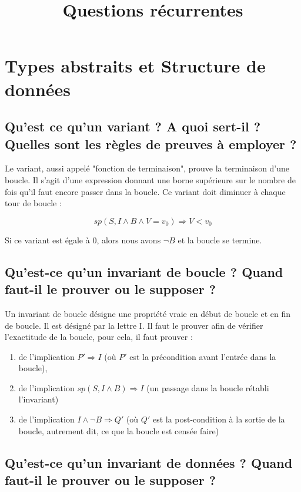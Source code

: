 \documentclass[11pt]{article}
\title{Questions récurrentes}
\begin{document}
\maketitle

\section{Types abstraits et Structure de données}
\subsection{Qu'est ce qu'un variant ? A quoi sert-il ? Quelles sont les règles de preuves à employer ?}

Le variant, aussi appelé "fonction de terminaison", prouve la terminaison d’une boucle. Il s’agit d’une expression donnant une borne supérieure sur le nombre de fois qu’il faut encore passer dans la boucle. 
Ce variant doit diminuer à chaque tour de boucle :

\begin{equation}
	sp(S, I \land B \land V = v_0) \Rightarrow V < v_0 
\end{equation}

Si ce variant est égale à 0, alors nous avons $\lnot B$ et la boucle se termine.

\subsection{Qu'est-ce qu'un invariant de boucle ? Quand faut-il le prouver ou le supposer ?}

Un invariant de boucle désigne une propriété vraie en début de boucle et en fin de boucle. Il est désigné par la lettre I. Il faut le prouver afin de vérifier l’exactitude de la boucle, pour cela, il faut prouver :

\begin{enumerate}
	\item de l’implication $P' \Rightarrow I$ (où $P'$ est la précondition avant l’entrée dans la boucle),
	\item de l'implication $sp(S, I \land B) \Rightarrow I$ (un passage dans la boucle rétabli l'invariant)
	\item de l'implication $I \land \lnot B \Rightarrow Q'$ (où $Q'$ est la post-condition à la sortie de la boucle, autrement dit, ce que la boucle est censée faire)
\end{enumerate}

\subsection{Qu'est-ce qu'un invariant de données ? Quand faut-il le prouver ou le supposer ?}
\end{document}
